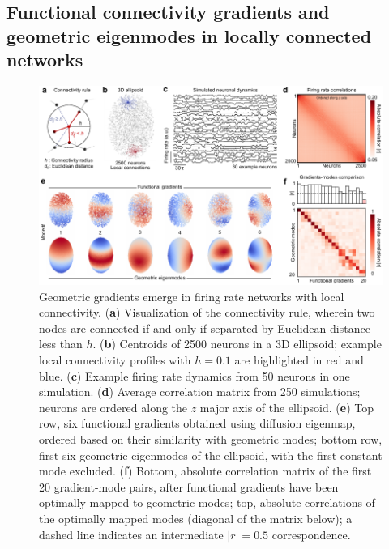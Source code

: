 \documentclass{article}
\begin{document}
\subsection*{Functional connectivity gradients and geometric eigenmodes in locally connected networks}

\begin{figure}[t]
    \centering
    \includegraphics[width=1.0\linewidth]{figures/figure1.pdf}
    \caption{Geometric gradients emerge in firing rate networks with local connectivity. (\textbf{a}) Visualization of the connectivity rule, wherein two nodes are connected if and only if separated by Euclidean distance less than $h$. (\textbf{b}) Centroids of 2500 neurons in a 3D ellipsoid; example local connectivity profiles with $h=0.1$ are highlighted in red and blue. (\textbf{c}) Example firing rate dynamics from 50 neurons in one simulation. (\textbf{d}) Average correlation matrix from 250 simulations; neurons are ordered along the $z$ major axis of the ellipsoid. (\textbf{e}) Top row, six functional gradients obtained using diffusion eigenmap, ordered based on their similarity with geometric modes; bottom row, first six geometric eigenmodes of the ellipsoid, with the first constant mode excluded. (\textbf{f}) Bottom, absolute correlation matrix of the first 20 gradient-mode pairs, after functional gradients have been optimally mapped to geometric modes; top, absolute correlations of the optimally mapped modes (diagonal of the matrix below); a dashed line indicates an intermediate $|r|=0.5$ correspondence.}
    \label{fig1}
    \hrulefill
\end{figure}
\end{document}
